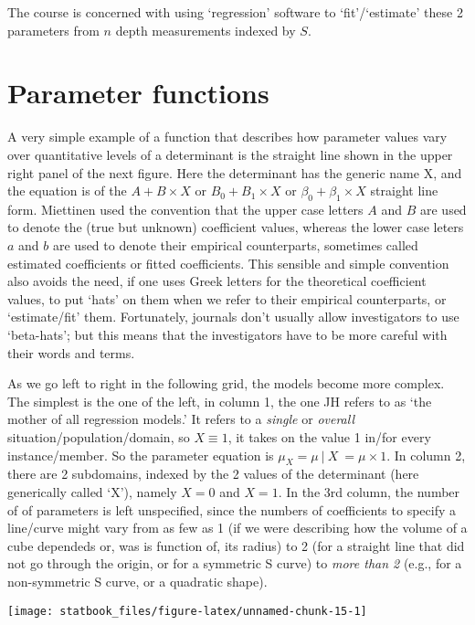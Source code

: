 \documentclass[]{book}
\begin{document}
The course is concerned with using `regression' software to `fit'/`estimate' these 2 parameters from \(n\) depth measurements indexed by \(S\).

\hypertarget{parameter-functions-1}{%
\section{Parameter functions}\label{parameter-functions-1}}

A very simple example of a function that describes how parameter values vary over quantitative levels of a determinant is the straight line shown in the upper right panel of the next figure. Here the determinant has the generic name X, and the equation is of the \(A + B \times X\) or \(B_0 + B_1 \times X\) or \(\beta_0 + \beta_1 \times X\) straight line form. Miettinen used the convention that the upper case letters \(A\) and \(B\) are used to denote the (true but unknown) coefficient values, whereas the lower case leters \(a\) and \(b\) are used to denote their empirical counterparts, sometimes called estimated coefficients or fitted coefficients. This sensible and simple convention also avoids the need, if one uses Greek letters for the theoretical coefficient values, to put `hats' on them when we refer to their empirical counterparts, or `estimate/fit' them. Fortunately, journals don't usually allow investigators to use `beta-hats'; but this means that the investigators have to be more careful with their words and terms.

As we go left to right in the following grid, the models become more complex. The simplest is the one of the left, in column 1, the one JH refers to as `the mother of all regression models.' It refers to a \emph{single} or \emph{overall} situation/population/domain, so \(X \equiv 1\), it takes on the value 1 in/for every instance/member. So the parameter equation is \(\mu_X = \mu \ | \ X \ = \mu \times 1.\) In column 2, there are 2 subdomains, indexed by the 2 values of the determinant (here generically called `X'), namely \(X = 0\) and \(X = 1\). In the 3rd column, the number of of parameters is left unspecified, since the numbers of coefficients to specify a line/curve might vary from as few as 1 (if we were describing how the volume of a cube dependeds or, was is function of, its radius) to 2 (for a straight line that did not go through the origin, or for a symmetric S curve) to \emph{more than 2} (e.g., for a non-symmetric S curve, or a quadratic shape).

\begin{center}\texttt{[image: statbook\_files/figure-latex/unnamed-chunk-15-1]} \end{center}
\end{document}
